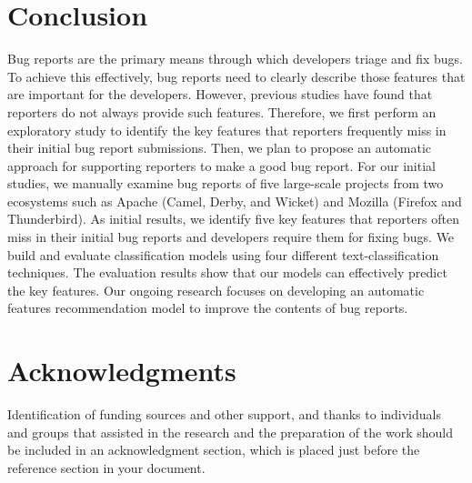 \documentclass[sigconf,authordraft]{acmart}
\begin{document}
\section{Conclusion}
Bug reports are the primary means through which developers triage and fix bugs. To achieve this effectively, bug reports need to clearly describe those features that are important for the developers. However, previous studies have found that reporters do not always provide such features. Therefore, we first perform an exploratory study to identify the key features that reporters frequently miss in their initial bug report submissions. Then, we plan to propose an automatic approach for supporting reporters to make a good bug report. For our initial studies, we manually examine bug reports of five large-scale projects from two ecosystems such as Apache (Camel, Derby, and Wicket) and Mozilla (Firefox and Thunderbird). As initial results, we identify five key features that reporters often miss in their initial bug reports and developers require them for fixing bugs. We build and evaluate classification models using four different text-classification techniques. The evaluation results show that our models can effectively predict the key features. Our ongoing research focuses on developing an automatic features recommendation model to improve the contents of bug reports. 


\section{Acknowledgments}

Identification of funding sources and other support, and thanks to individuals and groups that assisted in the research and the preparation of the work should be included in an acknowledgment section, which is placed just before the reference section in your document. 




%



% 
\end{document}
